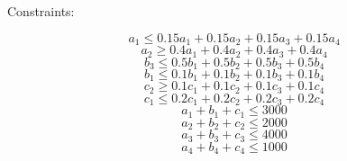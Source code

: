 \documentclass{article}%
\begin{document}
Constraints:%
\par%
\[%
a_{1} \leq 0.15 a_{1} + 0.15 a_{2} + 0.15 a_{3} + 0.15 a_{4}%
\]%
\[%
a_{2} \geq 0.4 a_{1} + 0.4 a_{2} + 0.4 a_{3} + 0.4 a_{4}%
\]%
\[%
b_{3} \leq 0.5 b_{1} + 0.5 b_{2} + 0.5 b_{3} + 0.5 b_{4}%
\]%
\[%
b_{1} \leq 0.1 b_{1} + 0.1 b_{2} + 0.1 b_{3} + 0.1 b_{4}%
\]%
\[%
c_{2} \geq 0.1 c_{1} + 0.1 c_{2} + 0.1 c_{3} + 0.1 c_{4}%
\]%
\[%
c_{1} \leq 0.2 c_{1} + 0.2 c_{2} + 0.2 c_{3} + 0.2 c_{4}%
\]%
\[%
a_{1} + b_{1} + c_{1} \leq 3000%
\]%
\[%
a_{2} + b_{2} + c_{2} \leq 2000%
\]%
\[%
a_{3} + b_{3} + c_{3} \leq 4000%
\]%
\[%
a_{4} + b_{4} + c_{4} \leq 1000%
\]

%
\end{document}
